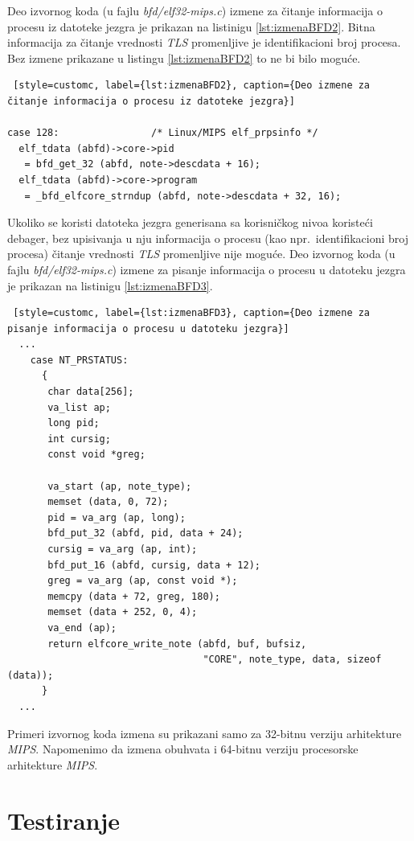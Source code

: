 \documentclass[12pt,oneside]{memoir}
\begin{document}
Deo izvornog koda (u fajlu \emph{bfd/elf32-mips.c}) izmene za čitanje informacija o procesu iz datoteke jezgra je prikazan na listinigu \ref{lst:izmenaBFD2}. Bitna informacija za čitanje vrednosti \emph{TLS} promenljive je identifikacioni broj procesa. Bez izmene prikazane u listingu \ref{lst:izmenaBFD2} to ne bi bilo moguće. \newpage
\begin{lstlisting} [style=customc, label={lst:izmenaBFD2}, caption={Deo izmene za čitanje informacija o procesu iz datoteke jezgra}]

case 128:                /* Linux/MIPS elf_prpsinfo */
  elf_tdata (abfd)->core->pid
   = bfd_get_32 (abfd, note->descdata + 16);
  elf_tdata (abfd)->core->program
   = _bfd_elfcore_strndup (abfd, note->descdata + 32, 16);
\end{lstlisting}

Ukoliko se koristi datoteka jezgra generisana sa korisničkog nivoa koristeći debager, bez upisivanja u nju informacija o procesu (kao npr.~identifikacioni broj procesa) čitanje vrednosti \emph{TLS} promenljive nije moguće. Deo izvornog koda (u fajlu \emph{bfd/elf32-mips.c}) izmene za pisanje informacija o procesu u datoteku jezgra je prikazan na listinigu \ref{lst:izmenaBFD3}.
\begin{lstlisting} [style=customc, label={lst:izmenaBFD3}, caption={Deo izmene za pisanje informacija o procesu u datoteku jezgra}]
  ...
    case NT_PRSTATUS:
      {
       char data[256];
       va_list ap;
       long pid;
       int cursig;
       const void *greg;

       va_start (ap, note_type);
       memset (data, 0, 72);
       pid = va_arg (ap, long);
       bfd_put_32 (abfd, pid, data + 24);
       cursig = va_arg (ap, int);
       bfd_put_16 (abfd, cursig, data + 12);
       greg = va_arg (ap, const void *);
       memcpy (data + 72, greg, 180);
       memset (data + 252, 0, 4);
       va_end (ap);
       return elfcore_write_note (abfd, buf, bufsiz,
                                  "CORE", note_type, data, sizeof (data));
      }
  ...
\end{lstlisting}

Primeri izvornog koda izmena su prikazani samo za 32-bitnu verziju arhitekture \emph{MIPS}. Napomenimo da izmena obuhvata i 64-bitnu verziju procesorske arhitekture \emph{MIPS}.

\section{Testiranje}
\end{document}
